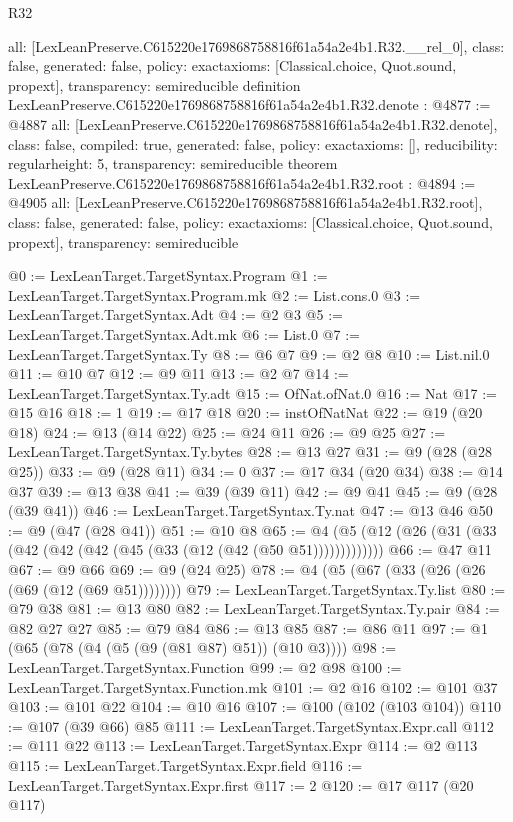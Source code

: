 \begin{lexlean}{R32}
\begin{coremodule}
{  all: [LexLeanPreserve.C615220e1769868758816f61a54a2e4b1.R32.__rel_0],
  class: false,
  generated: false,
  policy: exact{axioms: [Classical.choice, Quot.sound, propext]},
  transparency: semireducible
}
definition LexLeanPreserve.C615220e1769868758816f61a54a2e4b1.R32.denote : @4877 := @4887 {
  all: [LexLeanPreserve.C615220e1769868758816f61a54a2e4b1.R32.denote],
  class: false,
  compiled: true,
  generated: false,
  policy: exact{axioms: []},
  reducibility: regular{height: 5},
  transparency: semireducible
}
theorem LexLeanPreserve.C615220e1769868758816f61a54a2e4b1.R32.root : @4894 := @4905 {
  all: [LexLeanPreserve.C615220e1769868758816f61a54a2e4b1.R32.root],
  class: false,
  generated: false,
  policy: exact{axioms: [Classical.choice, Quot.sound, propext]},
  transparency: semireducible
}

@0 := LexLeanTarget.TargetSyntax.Program
@1 := LexLeanTarget.TargetSyntax.Program.mk
@2 := List.cons.{0}
@3 := LexLeanTarget.TargetSyntax.Adt
@4 := @2 @3
@5 := LexLeanTarget.TargetSyntax.Adt.mk
@6 := List.{0}
@7 := LexLeanTarget.TargetSyntax.Ty
@8 := @6 @7
@9 := @2 @8
@10 := List.nil.{0}
@11 := @10 @7
@12 := @9 @11
@13 := @2 @7
@14 := LexLeanTarget.TargetSyntax.Ty.adt
@15 := OfNat.ofNat.{0}
@16 := Nat
@17 := @15 @16
@18 := 1
@19 := @17 @18
@20 := instOfNatNat
@22 := @19 (@20 @18)
@24 := @13 (@14 @22)
@25 := @24 @11
@26 := @9 @25
@27 := LexLeanTarget.TargetSyntax.Ty.bytes
@28 := @13 @27
@31 := @9 (@28 (@28 @25))
@33 := @9 (@28 @11)
@34 := 0
@37 := @17 @34 (@20 @34)
@38 := @14 @37
@39 := @13 @38
@41 := @39 (@39 @11)
@42 := @9 @41
@45 := @9 (@28 (@39 @41))
@46 := LexLeanTarget.TargetSyntax.Ty.nat
@47 := @13 @46
@50 := @9 (@47 (@28 @41))
@51 := @10 @8
@65 := @4 (@5 (@12 (@26 (@31 (@33 (@42 (@42 (@42 (@45 (@33 (@12 (@42 (@50 @51)))))))))))))
@66 := @47 @11
@67 := @9 @66
@69 := @9 (@24 @25)
@78 := @4 (@5 (@67 (@33 (@26 (@26 (@69 (@12 (@69 @51))))))))
@79 := LexLeanTarget.TargetSyntax.Ty.list
@80 := @79 @38
@81 := @13 @80
@82 := LexLeanTarget.TargetSyntax.Ty.pair
@84 := @82 @27 @27
@85 := @79 @84
@86 := @13 @85
@87 := @86 @11
@97 := @1 (@65 (@78 (@4 (@5 (@9 (@81 @87) @51)) (@10 @3))))
@98 := LexLeanTarget.TargetSyntax.Function
@99 := @2 @98
@100 := LexLeanTarget.TargetSyntax.Function.mk
@101 := @2 @16
@102 := @101 @37
@103 := @101 @22
@104 := @10 @16
@107 := @100 (@102 (@103 @104))
@110 := @107 (@39 @66) @85
@111 := LexLeanTarget.TargetSyntax.Expr.call
@112 := @111 @22
@113 := LexLeanTarget.TargetSyntax.Expr
@114 := @2 @113
@115 := LexLeanTarget.TargetSyntax.Expr.field
@116 := LexLeanTarget.TargetSyntax.Expr.first
@117 := 2
@120 := @17 @117 (@20 @117)

\end{coremodule}
\end{lexlean}
